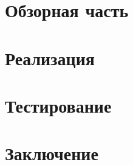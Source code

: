 \chapter{Обзорная часть}
	


\chapter{Реализация}
	
	
	
\chapter{Тестирование}
	

\chapter*{Заключение}
	
